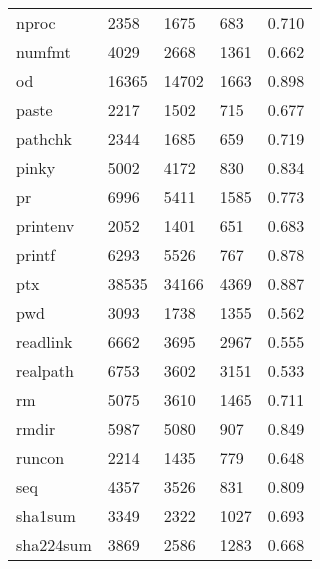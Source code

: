 \begin{longtable}{lp{3.0cm}p{3.0cm}p{3.0cm}p{3.0cm}}
nproc     &                     2358 &         1675 &           683 &                    0.710 \\
numfmt    &                     4029 &         2668 &          1361 &                    0.662 \\
od        &                    16365 &        14702 &          1663 &                    0.898 \\
paste     &                     2217 &         1502 &           715 &                    0.677 \\
pathchk   &                     2344 &         1685 &           659 &                    0.719 \\
pinky     &                     5002 &         4172 &           830 &                    0.834 \\
pr        &                     6996 &         5411 &          1585 &                    0.773 \\
printenv  &                     2052 &         1401 &           651 &                    0.683 \\
printf    &                     6293 &         5526 &           767 &                    0.878 \\
ptx       &                    38535 &        34166 &          4369 &                    0.887 \\
pwd       &                     3093 &         1738 &          1355 &                    0.562 \\
readlink  &                     6662 &         3695 &          2967 &                    0.555 \\
realpath  &                     6753 &         3602 &          3151 &                    0.533 \\
rm        &                     5075 &         3610 &          1465 &                    0.711 \\
rmdir     &                     5987 &         5080 &           907 &                    0.849 \\
runcon    &                     2214 &         1435 &           779 &                    0.648 \\
seq       &                     4357 &         3526 &           831 &                    0.809 \\
sha1sum   &                     3349 &         2322 &          1027 &                    0.693 \\
sha224sum &                     3869 &         2586 &          1283 &                    0.668 \\

\end{longtable}
